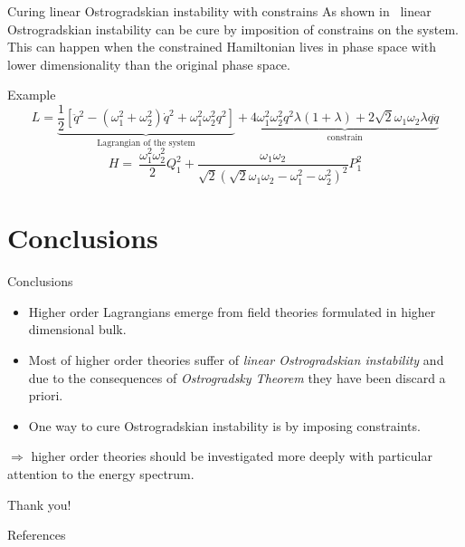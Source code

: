 \documentclass[10pt]{beamer}
\begin{document}
  \begin{frame}{Curing linear Ostrogradskian instability with constrains}
    As shown in~\cite{Chen13} linear Ostrogradskian instability can be cure by
    imposition of constrains on the system. This can happen when the constrained
    Hamiltonian lives in phase space with lower dimensionality than the original
    phase space. \vspace{1.0em}
    \begin{block}{Example}
      \vspace{0.2em}
      \begin{equation*}
        L =
        \underbrace{
          \frac{1}{2} \left[
          \ddot{q}^2 - (\omega_1^2 + \omega_2^2) \dot{q}^2 +
          \omega_1^2 \omega_2^2 q^2 \right]
        }_{\text{Lagrangian of the system}} +
        \underbrace{
          4 \omega_1^2\omega_2^2 q^2 \lambda (1+ \lambda) +
          2 \sqrt{2} \omega_1\omega_2 \lambda q \ddot{q}
        }_{\text{constrain}}
      \end{equation*}
      \vspace{0.2em}
      \begin{equation*}
        H =\ \frac{\omega_1^2\omega_2^2}{2} Q_1^2 +
        \frac{\omega_1\omega_2}{\sqrt{2} {\left(\sqrt{2} \omega_1\omega_2 -
        \omega_1^2 - \omega_2^2 \right)}^2} P_1^2
      \end{equation*}
    \end{block}
  \end{frame}

  \section{Conclusions}

  \begin{frame}{Conclusions}
    \begin{itemize}
      \item Higher order Lagrangians emerge from field theories formulated in
        higher dimensional bulk. \vspace{0.5em}
      \item Most of higher order theories suffer of \emph{linear Ostrogradskian
        instability} and due to the consequences of \emph{Ostrogradsky Theorem}
        they have been discard a priori. \vspace{0.5em}
      \item One way to cure Ostrogradskian instability is by imposing
        constraints.
    \end{itemize} \vspace{1.0em}
    $\Rightarrow$ higher order theories should be investigated more
    deeply with particular attention to the energy spectrum.
  \end{frame}

  \begin{frame}[standout]
    Thank you!
  \end{frame}

  \begin{frame}[allowframebreaks]{References}
    
    
  \end{frame}
\end{document}

